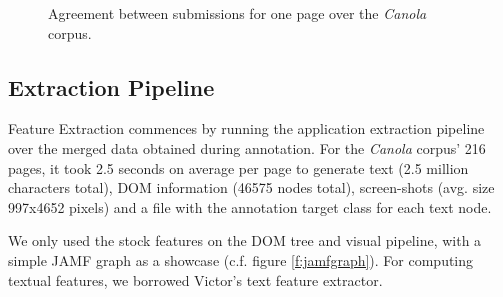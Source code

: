 \begin{figure}[h]
\centering
{}
\caption{
\label{f:merge}
\label{ens2}
	Agreement between submissions for one page over the \textit{Canola} corpus.}
\end{figure}


\subsection{Extraction Pipeline}

Feature Extraction commences by running the {\KrdWrd} application extraction pipeline over the merged data obtained during annotation. 
For the \textit{Canola} corpus' 216 pages, it took 2.5 seconds on average per page to generate text (2.5 million characters total), DOM information (46575 nodes total), screen-shots (avg. size 997x4652 pixels) and a file with the annotation target class for each text node.

We only used the stock {\KrdWrd} features on the DOM tree and visual pipeline, with a simple JAMF graph as a showcase (c.f. figure \ref{f:jamfgraph}).
For computing textual features, we borrowed Victor's \cite{spoustamarekpecina2008} text feature extractor.

